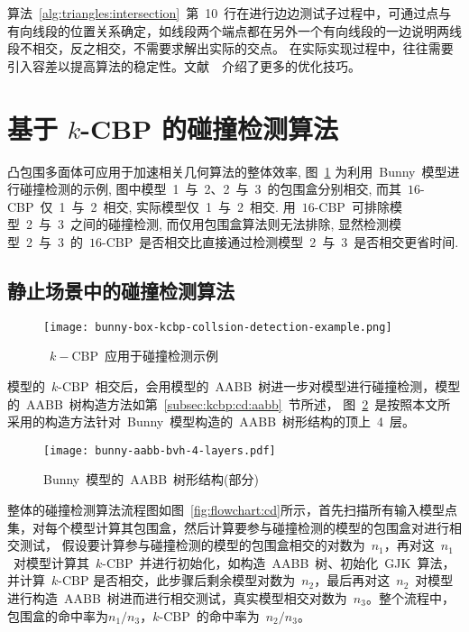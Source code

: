 算法~\ref{alg:triangles:intersection}~第~10~行在进行边边测试子过程中，可通过点与有向线段的位置关系确定，如线段两个端点都在另外一个有向线段的一边说明两线段不相交，反之相交，不需要求解出实际的交点。
在实际实现过程中，往往需要引入容差以提高算法的稳定性。文献~~介绍了更多的优化技巧。

\section{基于 $k$-CBP 的碰撞检测算法}
\label{sec:cd:baseon:kcbp}

凸包围多面体可应用于加速相关几何算法的整体效率, 图~\ref{lbl:bunny-box-kcbp-collsion-detection-example}
为利用~Bunny~模型进行碰撞检测的示例, 图中模型~1~与~2、2~与~3~的包围盒分别相交, 而其~$16$-CBP~仅~1~与~2~相交, 实际模型仅~1~与~2~相交.
用~$16$-CBP~可排除模型~2~与~3~之间的碰撞检测, 而仅用包围盒算法则无法排除, 显然检测模型~2~与~3~的~$16$-CBP~是否相交比直接通过检测模型~2~与~3~是否相交更省时间.

\subsection{静止场景中的碰撞检测算法}
\label{subsec:static:cd}

\begin{figure}[htbp] 
\centering
\texttt{[image: bunny-box-kcbp-collsion-detection-example.png]}
\caption{~$k-$CBP~应用于碰撞检测示例}
\label{lbl:bunny-box-kcbp-collsion-detection-example}
\end{figure}


模型的~$k$-CBP~相交后，会用模型的~AABB~树进一步对模型进行碰撞检测，模型的~AABB~树构造方法如第~\ref{subsec:kcbp:cd:aabb}~节所述，
图~\ref{fig:bunny:aabb:bvh:toplayer4}~是按照本文所采用的构造方法针对~Bunny~模型构造的~AABB~树形结构的顶上~4~层。

\begin{figure}[htpb]
  \centering
  \texttt{[image: bunny-aabb-bvh-4-layers.pdf]}
  \caption{Bunny~模型的~AABB~树形结构(部分)}
  \label{fig:bunny:aabb:bvh:toplayer4}
\end{figure}

整体的碰撞检测算法流程图如图~\ref{fig:flowchart:cd}所示，首先扫描所有输入模型点集，对每个模型计算其包围盒，然后计算要参与碰撞检测的模型的包围盒对进行相交测试，
假设要计算参与碰撞检测的模型的包围盒相交的对数为~$n_1$，再对这~$n_1$~对模型计算其~$k$-CBP~并进行初始化，如构造~AABB~树、初始化~GJK~算法，并计算~$k$-CBP
是否相交，此步骤后剩余模型对数为~$n_2$，最后再对这~$n_2$~对模型进行构造~AABB~树进而进行相交测试，真实模型相交对数为~$n_3$。整个流程中，包围盒的命中率为$n_1 / n_3$，$k$-CBP~的命中率为~$n_2/n_3$。


